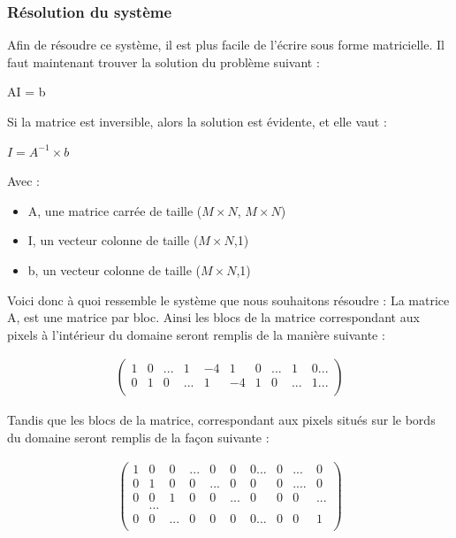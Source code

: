 \subsubsection{Résolution du système}
Afin de résoudre ce système, il est plus facile de l'écrire sous forme matricielle. Il faut maintenant trouver la solution du problème suivant : 
\begin{center}
 AI = b 
\end{center}
Si la matrice est inversible, alors la solution est évidente, et elle vaut : 
\begin{center}
$I = A^{-1}\times b$
\end{center} 
Avec : 
\begin{itemize}
\item A, une matrice carrée de taille ($M\times N$, $M\times N$)
\item I, un vecteur colonne de taille ($M\times N$,1)
\item b, un vecteur colonne de taille ($M\times N$,1)
\end{itemize}
Voici donc à quoi ressemble le système que nous souhaitons résoudre :
La matrice A, est une matrice par bloc. Ainsi les blocs de la matrice correspondant aux pixels à l'intérieur du domaine seront remplis de la manière  suivante : 
\begin{center}
\begin{equation}
\left.
\begin{aligned}
\begin{pmatrix}
	1 & 0 & ... &  1 &-4 & 1 & 0 & ... & 1 & 0... \\
	0 & 1 & 0   &... & 1 & -4& 1 & 0  &... & 1 ... \\
\end{pmatrix}
\end{aligned}
\right.
\end{equation}
\end{center}
Tandis que les blocs de la matrice, correspondant aux pixels situés sur le bords du domaine seront remplis de la façon suivante : 
\begin{center}
\begin{equation}
\left.
\begin{aligned}
\begin{pmatrix}
	1 & 0& 0 & ...& 0 & 0 & 0...&0& ... & 0\\
	0 & 1 & 0 & 0 & ... & 0 &0 &0&....&0\\
	0 & 0 & 1 & 0 & 0&... &0 &0 &0&...\\
	&...\\
	0 & 0 &... &0 &0 &0 &0...& 0& 0 & 1\\
\end{pmatrix}
\end{aligned}
\right.
\end{equation}
\end{center}

